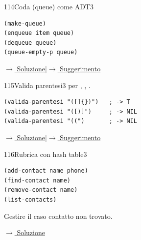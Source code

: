 \label{ex:114}
\begin{stdbox}{114}{Coda (queue) come ADT}{3}
\nopagebreak
\begin{lstlisting}
(make-queue)
(enqueue item queue)
(dequeue queue)
(queue-empty-p queue)
\end{lstlisting}

\small\color{black!55}\hyperref[sol:114]{$\rightarrow$ Soluzione}\enspace\textcolor{black!30}{|}\enspace\hyperref[hint:114]{$\rightarrow$ Suggerimento}\normalsize\color{black}
\end{stdbox}

\label{ex:115}
\begin{stdbox}{115}{Valida parentesi}{3}
  per
\fn{()}, \fn{[]}, \fn{\{\}}.
\begin{lstlisting}
(valida-parentesi "([]{})")   ; -> T
(valida-parentesi "([)]")     ; -> NIL
(valida-parentesi "((")       ; -> NIL
\end{lstlisting}

\small\color{black!55}\hyperref[sol:115]{$\rightarrow$ Soluzione}\enspace\textcolor{black!30}{|}\enspace\hyperref[hint:115]{$\rightarrow$ Suggerimento}\normalsize\color{black}
\end{stdbox}

\label{ex:116}
\begin{colbox}{116}{Rubrica con hash table}{3}
\nopagebreak
\begin{lstlisting}
(add-contact name phone)
(find-contact name)
(remove-contact name)
(list-contacts)
\end{lstlisting}
Gestire il caso contatto non trovato.


\small\color{black!55}\hyperref[sol:116]{$\rightarrow$ Soluzione}\normalsize\color{black}
\end{colbox}

